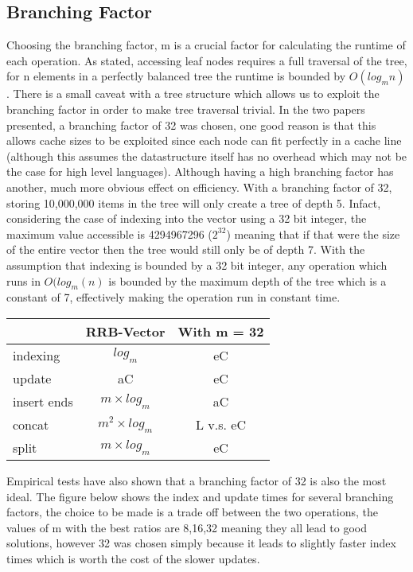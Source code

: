 \documentclass[11pt,a4paper,oneside]{article}
\begin{document}
\subsection{Branching Factor}

Choosing the branching factor, m is a crucial factor for calculating the runtime of each operation. As stated, accessing leaf nodes requires a full traversal of the tree, for n elements in a perfectly balanced tree the runtime is bounded by $O(log_m n)$. There is a small caveat with a tree structure which allows us to exploit the branching factor in order to make tree traversal trivial. In the two papers presented, a branching factor of 32 was chosen, one good reason is that this allows cache sizes to be exploited since each node can fit perfectly in a cache line\citep{stucki2015rrb} (although this assumes the datastructure itself has no overhead which may not be the case for high level languages). Although having a high branching factor has another, much more obvious effect on efficiency. With a branching factor of 32, storing 10,000,000 items in the tree will only create a tree of depth 5. Infact, considering the case of indexing into the vector using a 32 bit integer, the maximum value accessible is 4294967296 ($2^{32}$) meaning that if that were the size of the entire vector then the tree would still only be of depth 7. With the assumption that indexing is bounded by a 32 bit integer, any operation which runs in $O(log_m(n)$ is bounded by the maximum depth of the tree which is a constant of 7, effectively making the operation run in constant time.

	\begin{center}
	\begin{tabular}{| l || c | c |}
		\hline
		& RRB-Vector & With m = 32 \\
		\hline
		indexing & $ log_m $ & eC\\
		update & aC & eC \\
		insert ends & $ m \times log_m $ & aC \\
		concat & $ m^2 \times log_m $ & L v.s. eC \\
		split & $ m \times log_m $ & eC \\
		\hline
		\end{tabular}
	\end{center}

Empirical tests have also shown that a branching factor of 32 is also the most ideal. The figure below shows the index and update times for several branching factors, the choice to be made is a trade off between the two operations, the values of m with the best ratios are 8,16,32 meaning they all lead to good solutions, however 32 was chosen simply because it leads to slightly faster index times which is worth the cost of the slower updates.
\end{document}
